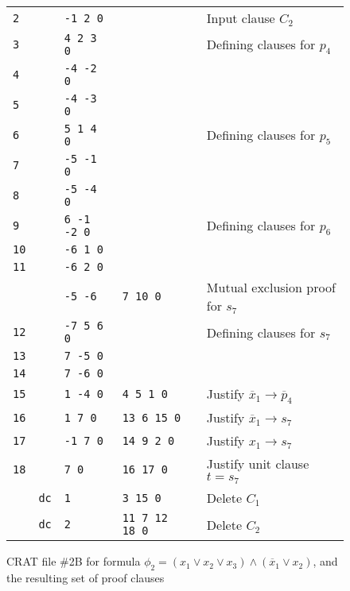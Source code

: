 \documentclass{llncs}
\newcommand{\obar}[1]{\overline{#1}}
\begin{document}
\begin{figure}
\begin{center}
\begin{tabular}{llllll}
    {\tt 2} &    & {\tt -1 2 0}  &            & & Input clause $C_2$ \\
    {\tt 3} &   & {\tt 4 2 3 0} &     & & Defining clauses for $p_4$ \\
    {\tt 4} &   & {\tt -4 -2 0} &     & & \\
    {\tt 5} &   & {\tt -4 -3 0} &     & & \\
    {\tt 6} &   & {\tt 5 1 4 0} &     & & Defining clauses for $p_5$ \\
    {\tt 7} &   & {\tt -5 -1 0} &     & & \\
    {\tt 8} &   & {\tt -5 -4 0} &     & & \\
    {\tt 9} &   & {\tt 6 -1 -2 0}&     & & Defining clauses for $p_6$ \\ 
    {\tt 10} &   & {\tt -6 1 0}    &  & & \\
    {\tt 11} &   & {\tt -6 2 0}    &  & & \\ 
     &           & {\tt -5 -6}   & {\tt 7 10 0}  & & Mutual exclusion proof for $s_7$ \\
    {\tt 12} &   & {\tt -7 5 6 0}  &     & & Defining clauses for $s_7$ \\ 
    {\tt 13} &   & {\tt  7 -5 0}    &  & & \\  
    {\tt 14} &   & {\tt  7 -6 0}    &  & & \\
    {\tt 15} &   & {\tt 1 -4 0}    & {\tt 4 5 1 0} & & Justify $\obar{x}_1 \rightarrow \obar{p}_4$ \\
    {\tt 16} &   & {\tt 1 7 0}     & {\tt 13 6 15 0} & & Justify $\obar{x}_1 \rightarrow s_7$ \\
    {\tt 17} &   & {\tt -1 7 0}    & {\tt 14 9 2 0} & & Justify $x_1 \rightarrow s_7$ \\
    {\tt 18} &   & {\tt 7 0}       & {\tt 16 17 0}  & & Justify unit clause $t = s_7$ \\
             & {\tt dc}  & {\tt 1}         & {\tt 3 15 0} & & Delete $C_1$\\
             & {\tt dc}  & {\tt 2}         & {\tt 11 7 12 18 0} & & Delete $C_2$\\
  \end{tabular}
  \end{center}  
  \caption{CRAT file \#2B for formula $\phi_2 = (x_1 \lor x_2 \lor x_3) \land (\obar{x}_1 \lor x_2)$, and the resulting set of proof clauses}
  \label{fig:p2-cdcl:crat}
\end{figure}
\end{document}
